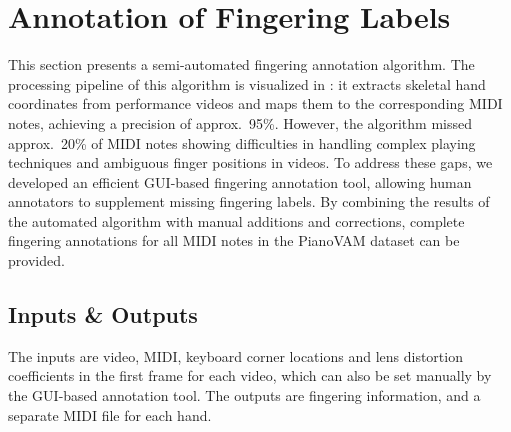 \documentclass{article}
\begin{document}

\section{Annotation of Fingering Labels}\label{sec:fingering_detection}
This section presents a semi-automated fingering annotation algorithm. 
The processing pipeline of this algorithm is visualized in : it extracts skeletal hand coordinates from performance videos and maps them to the corresponding MIDI notes, achieving a precision of approx.\ 95\%. However, the algorithm missed approx.\ 20\% of MIDI notes showing difficulties in handling complex playing techniques and ambiguous finger positions in videos. To address these gaps, we developed an efficient GUI-based fingering annotation tool, allowing human annotators to supplement missing fingering labels. By combining the results of the automated algorithm with manual additions and corrections, complete fingering annotations for all MIDI notes in the PianoVAM dataset can be provided.

\subsection{Inputs \& Outputs}
The inputs are video, MIDI, keyboard corner locations and lens distortion coefficients in the first frame for each video, which can also be set manually by the GUI-based annotation tool.
The outputs are fingering information, and a separate MIDI file  for each hand.

\end{document}

